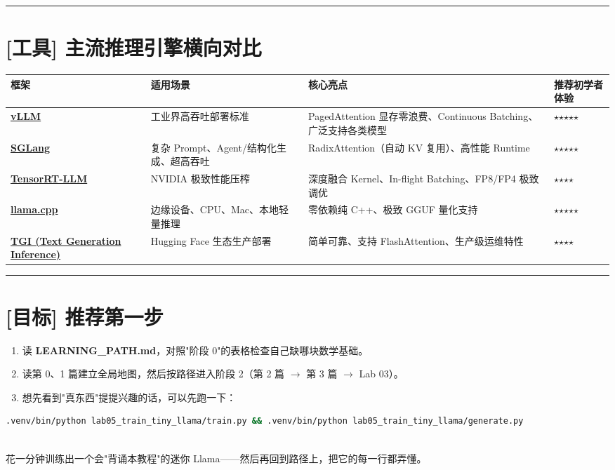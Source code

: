 \vspace{0.8em}\hrule\vspace{0.8em}

\section{[工具] 主流推理引擎横向对比}

\begin{center}
\small
\begin{tabularx}{\textwidth}{p{2.5cm} p{3.5cm} X X}
\toprule
\textbf{框架} & \textbf{适用场景} & \textbf{核心亮点} & \textbf{推荐初学者体验} \\
\midrule
\textbf{\href{https://github.com/vllm-project/vllm}{vLLM}} & 工业界高吞吐部署标准 & PagedAttention 显存零浪费、Continuous Batching、广泛支持各类模型 & $\star$$\star$$\star$$\star$$\star$ \\
\textbf{\href{https://github.com/sgl-project/sglang}{SGLang}} & 复杂 Prompt、Agent/结构化生成、超高吞吐 & RadixAttention（自动 KV 复用）、高性能 Runtime & $\star$$\star$$\star$$\star$$\star$ \\
\textbf{\href{https://github.com/NVIDIA/TensorRT-LLM}{TensorRT-LLM}} & NVIDIA 极致性能压榨 & 深度融合 Kernel、In-flight Batching、FP8/FP4 极致调优 & $\star$$\star$$\star$$\star$ \\
\textbf{\href{https://github.com/ggml-org/llama.cpp}{llama.cpp}} & 边缘设备、CPU、Mac、本地轻量推理 & 零依赖纯 C++、极致 GGUF 量化支持 & $\star$$\star$$\star$$\star$$\star$ \\
\textbf{\href{https://github.com/huggingface/text-generation-inference}{TGI (Text Generation Inference)}} & Hugging Face 生态生产部署 & 简单可靠、支持 FlashAttention、生产级运维特性 & $\star$$\star$$\star$$\star$ \\
\bottomrule
\end{tabularx}
\end{center}

\vspace{0.8em}\hrule\vspace{0.8em}

\section{[目标] 推荐第一步}

\begin{enumerate}
  \item 读 \textbf{LEARNING\_PATH.md}，对照"阶段 0"的表格检查自己缺哪块数学基础。
  \item 读第 0、1 篇建立全局地图，然后按路径进入阶段 2（第 2 篇 $\rightarrow$ 第 3 篇 $\rightarrow$ Lab 03）。
  \item 想先看到"真东西"提提兴趣的话，可以先跑一下：
\end{enumerate}

\begin{lstlisting}[language=bash]
   .venv/bin/python lab05_train_tiny_llama/train.py && .venv/bin/python lab05_train_tiny_llama/generate.py
   
\end{lstlisting}

   花一分钟训练出一个会"背诵本教程"的迷你 Llama——然后再回到路径上，把它的每一行都弄懂。
